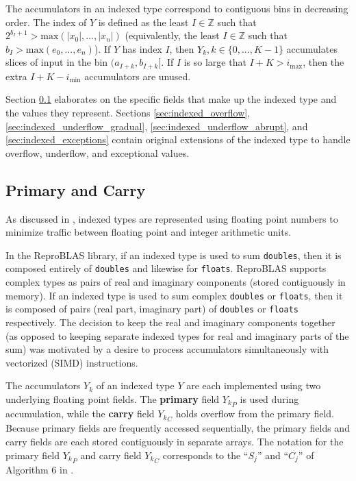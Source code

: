 \documentclass[12pt]{article}
\providecommand{\Z}{\ensuremath{\mathbb{Z}}}
\providecommand{\min}{\ensuremath{\text{min}}}
\providecommand{\max}{\ensuremath{\text{max}}}
\theoremstyle{definition}
\numberwithin{equation}{section}
\numberwithin{figure}{section}
\begin{document}
    The accumulators in an indexed type correspond to contiguous bins in decreasing order. The index of $Y$ is defined as the least $I \in \Z$ such that $2^{b_I + 1} > \max(|x_0|, ..., |x_n|)$ (equivalently, the least $I \in \Z$ such that $b_I > \max(e_0, ..., e_n)$). If $Y$ has index $I$, then $Y_k, k \in \{0, ..., K - 1\}$ accumulates slices of input in the bin $(a_{I + k}, b_{I + k}]$. If $I$ is so large that $I + K > i_{\max}$, then the extra $I + K - i_{\min}$ accumulators are unused.

    Section \ref{sec:indexed_primary_carry} elaborates on the specific fields that make up the indexed type and the values they represent. Sections \ref{sec:indexed_overflow}, \ref{sec:indexed_underflow_gradual}, \ref{sec:indexed_underflow_abrupt}, and \ref{sec:indexed_exceptions} contain original extensions of the indexed type to handle overflow, underflow, and exceptional values.

    \subsection{Primary and Carry}
      \label{sec:indexed_primary_carry}
      As discussed in \cite{repsum}, indexed types are represented using floating point numbers to minimize traffic between floating point and integer arithmetic units.

      In the ReproBLAS library, if an indexed type is used to sum \texttt{doubles}, then it is composed entirely of \texttt{doubles} and likewise for \texttt{floats}. ReproBLAS supports complex types as pairs of real and imaginary components (stored contiguously in memory). If an indexed type is used to sum complex \texttt{doubles} or \texttt{floats}, then it is composed of pairs (real part, imaginary part) of \texttt{doubles} or \texttt{floats} respectively. The decision to keep the real and imaginary components together (as opposed to keeping separate indexed types for real and imaginary parts of the sum) was motivated by a desire to process accumulators simultaneously with vectorized (SIMD) instructions.

      The accumulators $Y_k$ of an indexed type $Y$ are each implemented using two underlying floating point fields. The \textbf{primary} field ${Y_k}_P$ is used during accumulation, while the \textbf{carry} field ${Y_k}_C$ holds overflow from the primary field. Because primary fields are frequently accessed sequentially, the primary fields and carry fields are each stored contiguously in separate arrays. The notation for the primary field ${Y_k}_P$ and carry field ${Y_k}_C$ corresponds to the ``$S_j$'' and ``$C_j$'' of Algorithm $6$ in \cite{repsum}.
\end{document}
